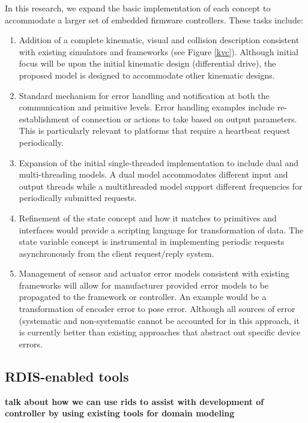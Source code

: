 In this research, we expand the basic implementation of each concept to accommodate a larger set of embedded firmware controllers.  These tasks include: 
\begin{enumerate}
\item Addition of a complete kinematic, visual and collision description consistent with existing simulators and frameworks (see Figure \ref{kvc}).  Although initial focus will be upon the initial kinematic design (differential drive), the proposed model is designed to accommodate other kinematic designs.
\item Standard mechanism for error handling and notification at both the communication and primitive levels.  Error handling examples include re-establishment of connection or actions to take based on output parameters.  This is particularly relevant to platforms that require a heartbeat request periodically.
\item Expansion of the initial single-threaded implementation to include dual and multi-threading models.  A dual model accommodates different input and output threads while a multithreaded model support different frequencies for periodically submitted requests. 
\item Refinement of the state concept and how it matches to primitives and interfaces would provide a scripting language for transformation of data.  The state variable concept is instrumental in implementing periodic requests asynchronously from the client request/reply system.
\item Management of sensor and actuator error models consistent with existing frameworks will allow for manufacturer provided error models to be propagated to the framework or controller.  An example would be a transformation of encoder error to pose error.  Although all sources of error (systematic and non-systematic cannot be accounted for in this approach, it is currently better than existing approaches that abstract out specific device errors.
\end{enumerate}



\subsection{RDIS-enabled tools}
{\bf talk about how we can use rids to assist with development of controller by using existing tools for domain modeling}
